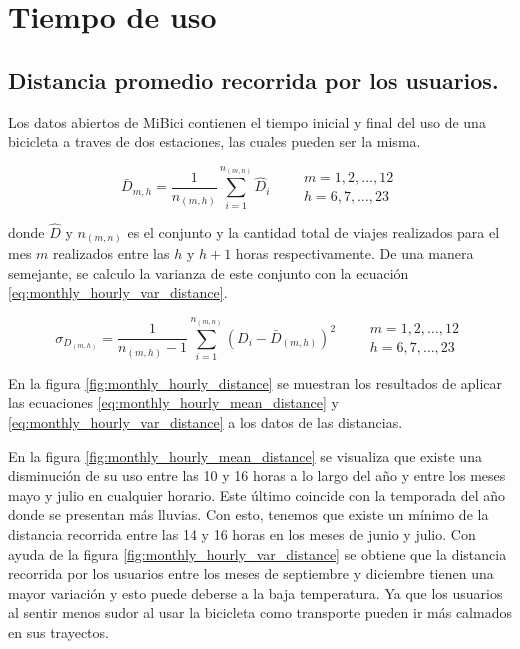 \section{Tiempo de uso}
\subsection{Distancia promedio recorrida por los usuarios.}

Los datos abiertos de MiBici contienen el tiempo inicial y final del uso de una bicicleta a traves de dos estaciones, las cuales pueden ser la misma.

\begin{equation}
    \bar{D}_{m,h} = \frac{1}{n_{(m,h)}} \sum_{i=1}^{n_{(m,n)}} \hat{D}_{i} \qquad \begin{matrix}
        m=1,2,\dots,12 \\ h=6,7,\dots,23
    \end{matrix} \label{eq:monthly_hourly_mean_distance}
\end{equation}

donde $\hat{D}$ y $n_{(m,n)}$ es el conjunto y la cantidad total de viajes realizados para el mes $m$ realizados entre las $h$ y $h+1$ horas respectivamente. De una manera semejante, se calculo la varianza de este conjunto con la ecuación \ref{eq:monthly_hourly_var_distance}.

\begin{equation}
    \sigma_{D_{(m,h)}} = \frac{1}{n_{(m,h)}-1} \sum_{i=1}^{n_{(m,n)}} (D_i-\bar{D}_{(m,h)})^2 \qquad \begin{matrix}
        m=1,2,\dots,12 \\ h=6,7,\dots,23
    \end{matrix} \label{eq:monthly_hourly_var_distance}
\end{equation}

En la figura \ref{fig:monthly_hourly_distance} se muestran los resultados de aplicar las ecuaciones \ref{eq:monthly_hourly_mean_distance} y \ref{eq:monthly_hourly_var_distance} a los datos de las distancias.

En la figura \ref{fig:monthly_hourly_mean_distance} se visualiza que existe una disminución de su uso entre las 10 y 16 horas a lo largo del año y entre los meses mayo y julio en cualquier horario. Este último coincide con la temporada del año donde se presentan más lluvias\cite{clima_guadalajara}. Con esto, tenemos que existe un mínimo de la distancia recorrida entre las 14 y 16 horas en los meses de junio y julio. Con ayuda de la figura \ref{fig:monthly_hourly_var_distance} se obtiene que la distancia recorrida por los usuarios entre los meses de septiembre y diciembre tienen una mayor variación y esto puede deberse a la baja temperatura\cite{clima_guadalajara}. Ya que los usuarios al sentir menos sudor al usar la bicicleta como transporte pueden ir más calmados en sus trayectos.

